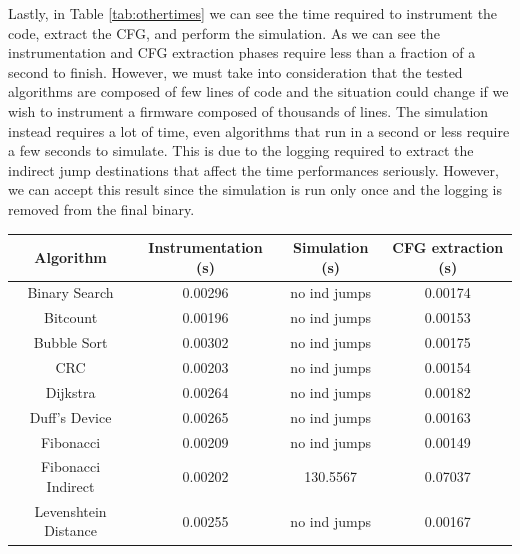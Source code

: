 Lastly, in Table \ref{tab:othertimes} we can see the time required to instrument
the code, extract the CFG, and perform the simulation. As we can see the instrumentation
and CFG extraction phases require less than a fraction of a second to finish.
However, we must take into consideration that the tested algorithms are composed
of few lines of code and the situation could change if we wish to instrument a firmware
composed of thousands of lines. The simulation instead requires a lot of time, even
algorithms that run in a second or less require a few seconds to simulate. This
is due to the logging required to extract the indirect jump destinations that
affect the time performances seriously. However, we can accept this result since
the simulation is run only once and the logging is removed from the final binary.

\begin{table}
  \centering
  \begin{tabular}{|c|c|c|c|}
    \hline
    \textbf{Algorithm}   & \textbf{Instrumentation (s)} & \textbf{Simulation (s)} & \textbf{CFG extraction (s)} \\
    \hline
    Binary Search        & 0.00296                      & no ind jumps            & 0.00174                     \\
    \hline
    Bitcount             & 0.00196                      & no ind jumps            & 0.00153                     \\
    \hline
    Bubble Sort          & 0.00302                      & no ind jumps            & 0.00175                     \\
    \hline
    CRC                  & 0.00203                      & no ind jumps            & 0.00154                     \\
    \hline
    Dijkstra             & 0.00264                      & no ind jumps            & 0.00182                     \\
    \hline
    Duff's Device        & 0.00265                      & no ind jumps            & 0.00163                     \\
    \hline
    Fibonacci            & 0.00209                      & no ind jumps            & 0.00149                     \\
    \hline
    Fibonacci Indirect   & 0.00202                      & 130.5567                & 0.07037                     \\
    \hline
    Levenshtein Distance & 0.00255                      & no ind jumps            & 0.00167                     \\

\end{tabular}
\end{table}
